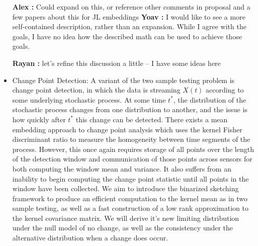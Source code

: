 \documentclass{article}
\newcommand{\comment}[3]{{\color{#1} {\bf #2 :} #3}}
\newcommand{\yoav}[1]{\comment{magenta}{Yoav}{#1}}
\newcommand{\rayan}[1]{\comment{red}{Rayan}{#1}}
\newcommand{\alex}[1]{\comment{green}{Alex}{#1}}
\begin{document}
\begin{itemize}
\alex{Could expand on this, or reference other comments in proposal and a few papers about this for JL embeddings}
\yoav{I would like to see a more self-contained description, rather
  than an expansion. While I agree with the goals, I have no idea how
  the described math can be used to achieve those goals.}

\rayan{let's refine this discussion a little -- I have some ideas here}

\item Change Point Detection: A variant of the two sample testing problem is change point detection, in which the data is streaming $X(t)$ according to some underlying stochastic process.  At some time $t^*$, the distribution of the stochastic process changes from one distribution to another, and the issue is how quickly after $t^*$ this change can be detected.   There exists a mean embedding approach to change point analysis \cite{Bach 2008} which uses the kernel Fisher discriminant ratio to measure the homogeneity between time segments of the process.  However, this once again requires storage of all points over the length of the detection window and communication of those points across sensors for both computing the window mean and variance. It also suffers from an inability to begin computing the change point statistic until all points in the window have been collected.  We aim to introduce the binarized sketching framework to produce an efficient computation to the kernel mean as in two sample testing, as well as a fast construction of a low rank approximation to the kernel covariance matrix.  We will derive it's new limiting distribution under the null model of no change, as well as the consistency under the alternative distribution when a change does occur.  


\end{itemize}
\end{document}
